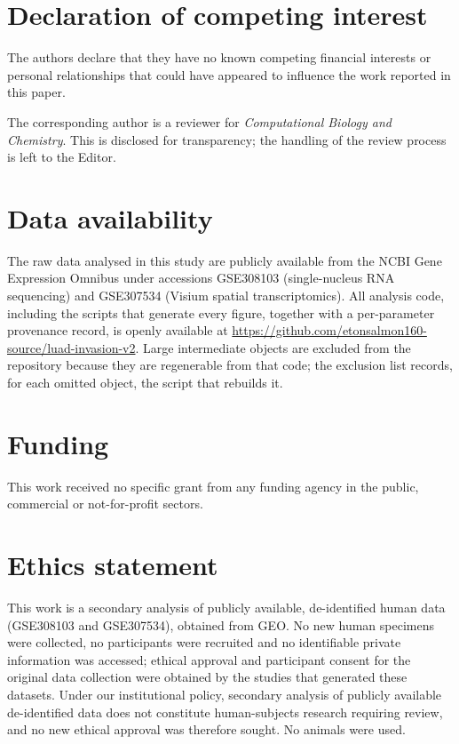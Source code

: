 \documentclass[review,12pt,authoryear]{elsarticle}
\begin{document}
\section*{Declaration of competing interest}

The authors declare that they have no known competing financial interests or personal
relationships that could have appeared to influence the work reported in this paper.

The corresponding author is a reviewer for \emph{Computational Biology and Chemistry}.
This is disclosed for transparency; the handling of the review process is left to the
Editor.

\section*{Data availability}

The raw data analysed in this study are publicly available from the NCBI Gene Expression
Omnibus under accessions GSE308103 (single-nucleus RNA sequencing) and GSE307534 (Visium
spatial transcriptomics). All analysis code, including the scripts that generate every
figure, together with a per-parameter provenance record, is openly available at
\url{https://github.com/etonsalmon160-source/luad-invasion-v2}. Large intermediate objects
are excluded from the repository because they are regenerable from that code; the
exclusion list records, for each omitted object, the script that rebuilds it.

\section*{Funding}

This work received no specific grant from any funding agency in the public, commercial or
not-for-profit sectors.

\section*{Ethics statement}

This work is a secondary analysis of publicly available, de-identified human data
(GSE308103 and GSE307534), obtained from GEO. No new human specimens were collected, no
participants were recruited and no identifiable private information was accessed; ethical
approval and participant consent for the original data collection were obtained by the
studies that generated these datasets. Under our institutional policy, secondary analysis
of publicly available de-identified data does not constitute human-subjects research
requiring review, and no new ethical approval was therefore sought. No animals were used.
\end{document}
